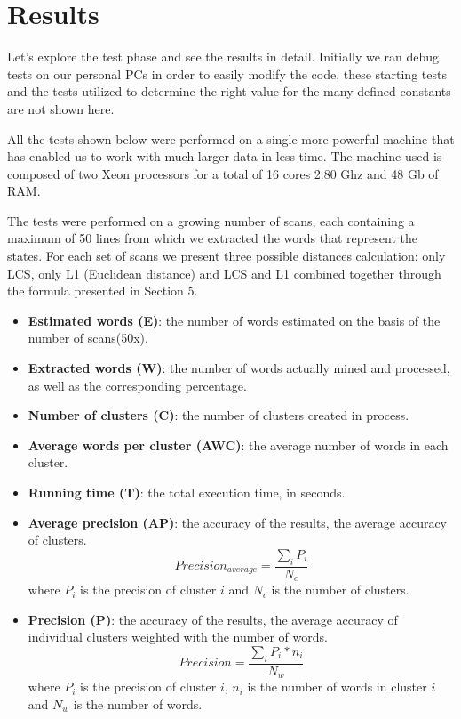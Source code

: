 \section{Results}

Let's explore the test phase and see the results in detail. Initially we ran debug tests on our personal PCs in order to easily modify the code, these starting tests and the tests utilized to determine the right value for the many defined constants are not shown here. 

All the tests shown below were performed on a single more powerful machine that has enabled us to work with much larger data in less time. The machine used is composed of two Xeon processors for a total of 16 cores 2.80 Ghz and 48 Gb of RAM.

The tests were performed on a growing number of scans, each containing a maximum of 50 lines from which we extracted the words that represent the states. For each set of scans we present three possible distances calculation: only LCS, only L1 (Euclidean distance) and LCS and L1 combined together through the formula presented in Section 5.

\vspace{3mm}

\begin{itemize}
\item \textbf{Estimated words (E)}: the number of words estimated on the basis of the number of scans(50x).
\item \textbf{Extracted words (W)}: the number of words actually mined and processed, as well as the corresponding percentage.
\item \textbf{Number of clusters (C)}: the number of clusters created in process.
\item \textbf{Average words per cluster (AWC)}: the average number of words in each cluster.
\item \textbf{Running time (T)}: the total execution time, in seconds.
\item \textbf{Average precision (AP)}: the accuracy of the results, the average accuracy of clusters.
$$Precision_{average} = \frac{\sum_i P_i}{N_c}$$
where $P_i$ is the precision of cluster $i$ and $N_c$ is the number of clusters. 
\item \textbf{Precision (P)}: the accuracy of the results, the average accuracy of individual clusters weighted with the number of words.
$$Precision = \frac{\sum_i P_i * n_i}{N_w}$$
where $P_i$ is the precision of cluster $i$, $n_i$ is the number of words in cluster $i$ and $N_w$ is the number of words. 
\end{itemize}

